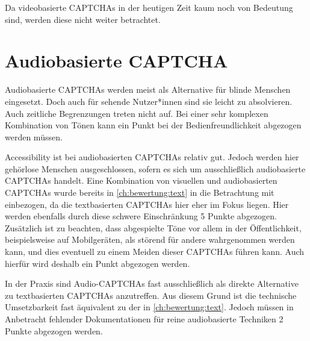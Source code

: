 Da videobasierte CAPTCHAs in der heutigen Zeit kaum noch von Bedeutung sind, werden diese nicht weiter betrachtet.

\section{Audiobasierte CAPTCHA}
\label{ch:bewertung:audio}
Audiobasierte CAPTCHAs werden meist als Alternative für blinde Menschen eingesetzt.
Doch auch für sehende Nutzer*innen sind sie leicht zu absolvieren.
Auch zeitliche Begrenzungen treten nicht auf.
Bei einer sehr komplexen Kombination von Tönen kann ein Punkt bei der Bedienfreundlichkeit abgezogen werden müssen.

Accessibility ist bei audiobasierten CAPTCHAs relativ gut. 
Jedoch werden hier gehörlose Menschen ausgeschlossen, sofern es sich um ausschließlich audiobasierte CAPTCHAs handelt.
Eine Kombination von visuellen und audiobasierten CAPTCHAs wurde bereits in \autoref{ch:bewertung:text} in die Betrachtung mit einbezogen,
da die textbasierten CAPTCHAs hier eher im Fokus liegen.
Hier werden ebenfalls durch diese schwere Einschränkung 5 Punkte abgezogen.
Zusätzlich ist zu beachten, dass abgespielte Töne vor allem in der Öffentlichkeit, beispielsweise auf Mobilgeräten, als störend für andere wahrgenommen werden kann,
und dies eventuell zu einem Meiden dieser CAPTCHAs führen kann.
Auch hierfür wird deshalb ein Punkt abgezogen werden. 

In der Praxis sind Audio-CAPTCHAs fast ausschließlich als direkte Alternative zu textbasierten CAPTCHAs anzutreffen.
Aus diesem Grund ist die technische Umsetzbarkeit fast äquivalent zu der in \autoref{ch:bewertung:text}.
Jedoch müssen in Anbetracht fehlender Dokumentationen für reine audiobasierte Techniken 2 Punkte abgezogen werden.


